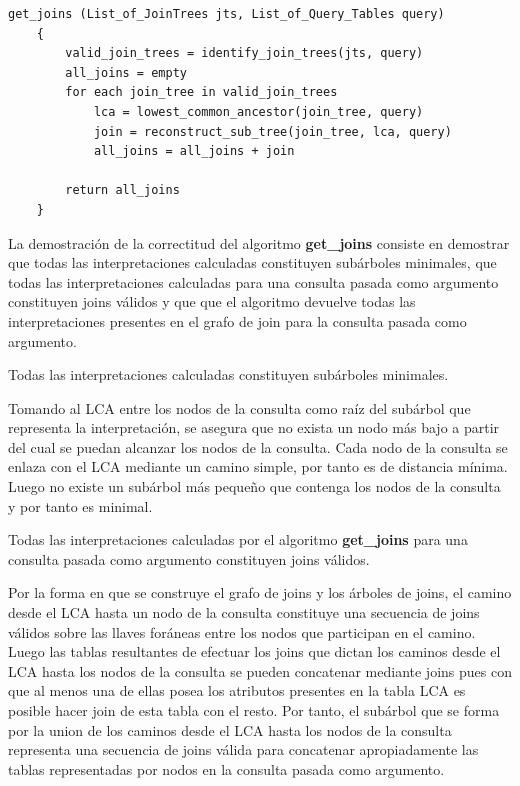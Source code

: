 \begin{lstlisting}[label={querytime}, caption={Pseudoc\'odigo del algoritmo de inferencia de joins}]
    get_joins (List_of_JoinTrees jts, List_of_Query_Tables query)
    {
        valid_join_trees = identify_join_trees(jts, query)
        all_joins = empty
        for each join_tree in valid_join_trees
            lca = lowest_common_ancestor(join_tree, query)
            join = reconstruct_sub_tree(join_tree, lca, query)
            all_joins = all_joins + join

        return all_joins
    }
\end{lstlisting}

La demostración de la correctitud del algoritmo \textbf{get\_joins} consiste en demostrar 
que todas las interpretaciones calculadas constituyen sub\'arboles minimales, que todas las interpretaciones calculadas
para una consulta pasada como argumento constituyen 
joins v\'alidos y que que el algoritmo devuelve todas las interpretaciones presentes en el grafo de join 
para la consulta pasada como argumento.

\begin{theorem}
    Todas las interpretaciones calculadas constituyen subárboles minimales.
\end{theorem}

Tomando al LCA entre los nodos de la consulta como raíz del subárbol que representa la interpretaci\'on, 
se asegura que no exista un nodo m\'as bajo a partir del cual se puedan alcanzar los nodos de la consulta. 
Cada nodo de la consulta se enlaza con el LCA mediante un camino simple, por tanto es de distancia m\'inima.
Luego no existe un subárbol m\'as pequeño que contenga los nodos de la consulta y por tanto es minimal. 


\begin{theorem}
    Todas las interpretaciones calculadas por el algoritmo \textbf{get\_joins} para una consulta pasada como 
    argumento constituyen joins v\'alidos.
\end{theorem}

Por la forma en que se construye el grafo de joins y los \'arboles de joins, el camino desde el 
LCA hasta un nodo de la consulta constituye una secuencia de joins v\'alidos sobre las llaves for\'aneas entre los 
nodos que participan en el camino. Luego las tablas resultantes de efectuar los joins que dictan los caminos 
desde el LCA hasta los nodos de la consulta se pueden concatenar mediante joins pues con que al menos una de ellas posea 
los atributos presentes en la tabla LCA es posible hacer join de esta tabla con el resto. Por tanto, el sub\'arbol que se forma por la union de los 
caminos desde el LCA hasta los nodos de la consulta representa una secuencia de joins v\'alida para concatenar 
apropiadamente las tablas representadas por nodos en la consulta pasada como argumento. 

